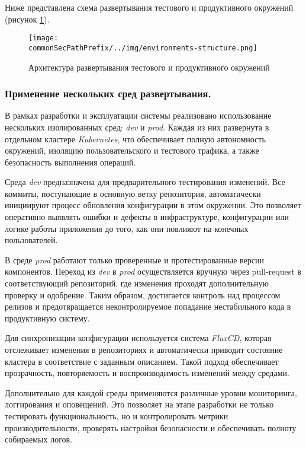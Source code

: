 Ниже представлена схема развертывания тестового и продуктивного окружений (рисунок \ref{fig:environments-structure.png}).

\begin{figure}[ht]
    \centering
    \texttt{[image: \\commonSecPathPrefix/../img/environments-structure.png]}
    \caption{Архитектура развертывания тестового и продуктивного окружений}
    \label{fig:environments-structure.png}
\end{figure}

\subsubsection{Применение нескольких сред развертывания.}
В рамках разработки и эксплуатации системы реализовано использование нескольких изолированных сред: \textit{dev} и \textit{prod}. Каждая из них развернута в отдельном кластере \textit{Kubernetes}, что обеспечивает полную автономность окружений, изоляцию пользовательского и тестового трафика, а также безопасность выполнения операций.

Среда \textit{dev} предназначена для предварительного тестирования изменений. Все коммиты, поступающие в основную ветку репозитория, автоматически инициируют процесс обновления конфигурации в этом окружении. Это позволяет оперативно выявлять ошибки и дефекты в инфраструктуре, конфигурации или логике работы приложения до того, как они повлияют на конечных пользователей.

В среде \textit{prod} работают только проверенные и протестированные версии компонентов. Переход из \textit{dev} в \textit{prod} осуществляется вручную через pull-request в соответствующий репозиторий, где изменения проходят дополнительную проверку и одобрение. Таким образом, достигается контроль над процессом релизов и предотвращается неконтролируемое попадание нестабильного кода в продуктивную систему.

Для синхронизации конфигурации используется система \textit{FluxCD}, которая отслеживает изменения в репозиториях и автоматически приводит состояние кластера в соответствие с заданным описанием. Такой подход обеспечивает прозрачность, повторяемость и воспроизводимость изменений между средами.

Дополнительно для каждой среды применяются различные уровни мониторинга, логгирования и оповещений. Это позволяет на этапе разработки не только тестировать функциональность, но и контролировать метрики производительности, проверять настройки безопасности и обеспечивать полноту собираемых логов.


